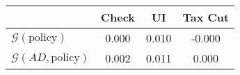 \begin{tabular}{@{}lccc@{}} 
\toprule 
                          & Check      & UI    & Tax Cut    \\  \midrule 
$\mathcal{G}(\text{policy})$ & 0.000  & 0.010  & -0.000     \\ 
$\mathcal{G}(AD,\text{policy})$ & 0.002  & 0.011  & 0.000     \\ 
\end{tabular}  
